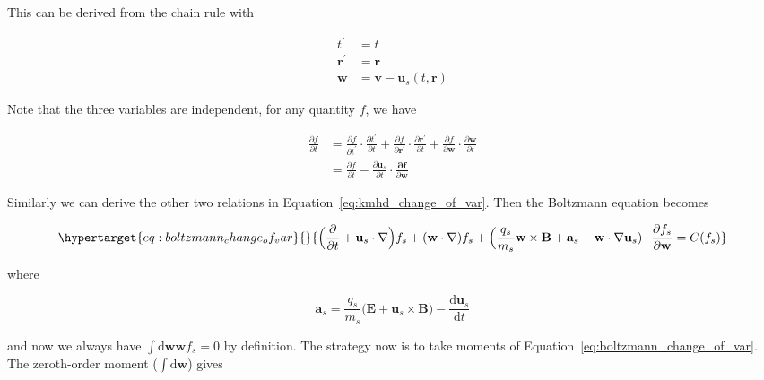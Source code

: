 \documentclass[
  notoc %
]{tufte-book}
\begin{document}
This can be derived from the chain rule with

\[
\begin{aligned}
t^\prime &= t \\
\mathbf{r}^\prime &= \mathbf{r} \\
\mathbf{w} &= \mathbf{v} - \mathbf{u}_s(t,\mathbf{r})
\end{aligned}
\]

Note that the three variables are independent, for any quantity \(f\),
we have

\[
\begin{aligned}
\frac{\partial f}{\partial t} &= \frac{\partial f}{\partial t^\prime}\cdot\frac{\partial t^\prime}{\partial t} + \frac{\partial f}{\partial \mathbf{r}^\prime}\cdot\frac{\partial\mathbf{r}^\prime}{\partial t} + \frac{\partial f}{\partial\mathbf{w}}\cdot\frac{\partial\mathbf{w}}{\partial t} \\
&= \frac{\partial f}{\partial t} - \frac{\partial\mathbf{u}_s}{\partial t}\cdot\frac{\mathbf{\partial f}}{\partial \mathbf{w}}
\end{aligned}
\]

Similarly we can derive the other two relations in
Equation~\ref{eq:kmhd_change_of_var}. Then the Boltzmann equation
becomes

\begin{equation}\protect\hypertarget{eq:boltzmann_change_of_var}{}{
\Big( \frac{\partial}{\partial t} + \mathbf{u}_s\cdot\nabla\Big)f_s + (\mathbf{w}\cdot\nabla)f_s + \Big(\frac{q_s}{m_s}\mathbf{w}\times\mathbf{B} +\mathbf{a}_s -\mathbf{w}\cdot\nabla\mathbf{u}_s )\cdot\frac{\partial f_s}{\partial\mathbf{w}} = C(f_s)
}\label{eq:boltzmann_change_of_var}\end{equation}

where

\[
\mathbf{a}_s = \frac{q_s}{m_s}\Big(\mathbf{E} + \mathbf{u}_s\times\mathbf{B} \Big) - \frac{\mathrm{d}\mathbf{u}_s}{\mathrm{d}t}
\]

and now we always have \(\int \mathrm{d}\mathbf{w}\mathbf{w}f_s = 0\) by
definition. The strategy now is to take moments of
Equation~\ref{eq:boltzmann_change_of_var}. The zeroth-order moment
(\(\int \mathrm{d}\mathbf{w}\)) gives
\end{document}
